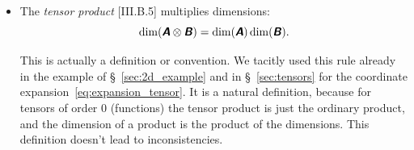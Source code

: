 \documentclass[\ifafour a4paper,12pt,\else a5paper,10pt,\fi%
onecolumn,oneside,article,%
british%
]{memoir}
\makeatletter
\theoremstyle{remark}
\theoremstyle{innote}
\newcommand*{\mathte}[1]{\textbf{\textit{\textsf{#1}}}}
\newcommand*{\de}{\partialup}%
\newcommand*{\di}{\mathrm{d}}%
\renewcommand*{\|}[1][]{\nonscript\,#1\vert\nonscript\;\mathopen{}}
\newcommand*{\sect}{\S}%
\newcommand*{\q}{}%
\DeclareRobustCommand*{\q}{%
  \mathbin{\mathpalette\bigcdot@{}}%
}
\newcommand*{\bigcdot@scalefactor}{0.7}
\newcommand*{\bigcdot@widthfactor}{1.5}
\newcommand*{\bigcdot@}[2]{%
  \sbox0{$#1\vcenter{}$}%
  \sbox2{$#1\cdot\m@th$}%
  \hbox to \bigcdot@widthfactor\wd2{%
    \hfil
    \raise\ht0\hbox{%
      \scalebox{\bigcdot@scalefactor}{%
        \lower\ht0\hbox{$#1\bullet\m@th$}%
      }%
    }%
    \hfil
  }%
}
\newcommand*{\Xx}{\textsf{X}}
\newcommand*{\Aa}{\textsf{A}}
\newcommand*{\Bb}{\textsf{B}}
\newcommand*{\yA}{\mathte{A}}
\newcommand*{\yB}{\mathte{B}}
\renewcommand*{\i}{\indices}
\newcommand*{\dex}[1][i]{\frac{\de}{\de x^{#1}}}
\newcommand*{\dix}[1][i]{\di x^{#1}}
\makeatother
\begin{document}
\begin{itemize}[wide=0pt]
\item The \emph{tensor product} [III.B.5] multiplies dimensions:
  \begin{equation}
  \dim(\yA\otimes\yB) = \dim(\yA)\dim(\yB).\label{eq:tensor_mult}
\end{equation}

This is actually a definition or convention. We tacitly used this rule
already in the example of \sect~\ref{sec:2d_example} and in
\sect~\ref{sec:tensors} for the coordinate
expansion~\eqref{eq:expansion_tensor}. It is a natural definition, because
for tensors of order 0 (functions) the tensor product is just the ordinary
product, and the dimension of a product is the product of the dimensions.
This definition doesn't lead to inconsistencies.







\end{itemize}
\end{document}
